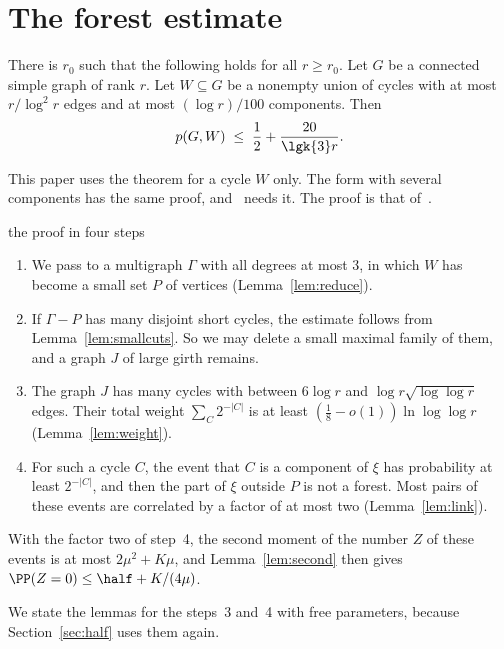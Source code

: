 \section{The forest estimate}\label{sec:forest}

\begin{theorem}\label{thm:forest}
There is $r_0$ such that the following holds for all $r\ge r_0$. Let $G$ be a connected simple graph
of rank $r$. Let $W\subseteq G$ be a nonempty union of cycles with at most $r/\log^{2}r$ edges and
at most $(\log r)/100$ components. Then
\begin{equation}\label{eq:forest}
  p(G,W)\;\le\;\frac12+\frac{20}{\lgk{3}r}.
\end{equation}
\end{theorem}

This paper uses the theorem for a cycle $W$ only. The form with several components has the same
proof, and~\cite{Pan} needs it. The proof is that of~\cite{KNT}.

\begin{idea}{the proof in four steps}
\begin{enumerate}[leftmargin=1.5em]
\item We pass to a multigraph $\Gamma$ with all degrees at most $3$, in which $W$ has become a
small set $P$ of vertices (Lemma~\ref{lem:reduce}).
\item If $\Gamma-P$ has many disjoint short cycles, the estimate follows from
Lemma~\ref{lem:smallcuts}. So we may delete a small maximal family of them, and a graph $J$ of
large girth remains.
\item The graph $J$ has many cycles with between $6\log r$ and $\log r\sqrt{\log\log r}$ edges.
Their total weight $\sum_C2^{-|C|}$ is at least $(\frac18-o(1))\ln\log\log r$
(Lemma~\ref{lem:weight}).
\item For such a cycle $C$, the event that $C$ is a component of $\xi$ has probability at least
$2^{-|C|}$, and then the part of $\xi$ outside $P$ is not a forest. Most pairs of these events are
correlated by a factor of at most two (Lemma~\ref{lem:link}).
\end{enumerate}
With the factor two of step~4, the second moment of the number $Z$ of these events is at most
$2\mu^{2}+K\mu$, and Lemma~\ref{lem:second} then gives $\PP(Z=0)\le\half+K/(4\mu)$.
\end{idea}

We state the lemmas for the steps~3 and~4 with free parameters, because Section~\ref{sec:half}
uses them again.

